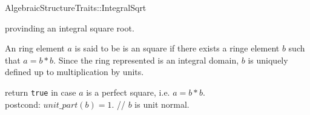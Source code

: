 

\begin{ccRefConcept}{AlgebraicStructureTraits::IntegralSqrt}

\begin{ccAdvanced}
\ccDefinition

 provinding an integral square root. 

An ring element $a$ is said to be is an square if there exists a ringe element $b$ such 
that $a= b*b$. Since the ring represented is an integral domain, 
$b$ is uniquely defined up to multiplication by units. 

\ccRefines 


\ccTypes
{}

\ccOperations
{}
        { return {\tt true} in case $a$ is a perfect square, i.e. $a = b*b$.\\
          postcond: $unit\_part(b) = 1$. // $b$ is unit normal. 
        }


\ccSeeAlso

\end{ccAdvanced}

\end{ccRefConcept} 